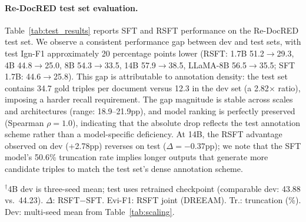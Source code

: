 \paragraph{Re-DocRED test set evaluation.}
Table~\ref{tab:test_results} reports SFT and RSFT performance on the Re-DocRED test set. We observe a consistent performance gap between dev and test sets, with test Ign-F1 approximately 20 percentage points lower (RSFT: 1.7B 51.2$\to$29.3, 4B 44.8$\to$25.0, 8B 54.3$\to$33.5, 14B 57.9$\to$38.5, LLaMA-8B 56.5$\to$35.5; SFT 1.7B: 44.6$\to$25.8). This gap is attributable to annotation density: the test set contains 34.7 gold triples per document versus 12.3 in the dev set (a 2.82$\times$ ratio), imposing a harder recall requirement. The gap magnitude is stable across scales and architectures (range: 18.9--21.9pp), and model ranking is perfectly preserved (Spearman $\rho{=}1.0$), indicating that the absolute drop reflects the test annotation scheme rather than a model-specific deficiency. At 14B, the RSFT advantage observed on dev (+2.78pp) reverses on test ($\Delta{=}{-}0.37$pp); we note that the SFT model's 50.6\% truncation rate implies longer outputs that generate more candidate triples to match the test set's dense annotation scheme.

\begin{table}[t]
\centering
\caption{SFT and RSFT performance on Re-DocRED test set (Ign-F1 \%). Dev Ign-F1 (RSFT) from Table~\ref{tab:scaling}. All test results use s42.}
\label{tab:test_results}
\small
{}
\vspace{1mm}
{\raggedright\footnotesize $^\dagger$4B dev is three-seed mean; test uses retrained checkpoint (comparable dev: 43.88 vs.\ 44.23). $\Delta$: RSFT$-$SFT. Evi-F1: RSFT joint (DREEAM). Tr.: truncation (\%). Dev: multi-seed mean from Table~\ref{tab:scaling}.\par}
\end{table}

